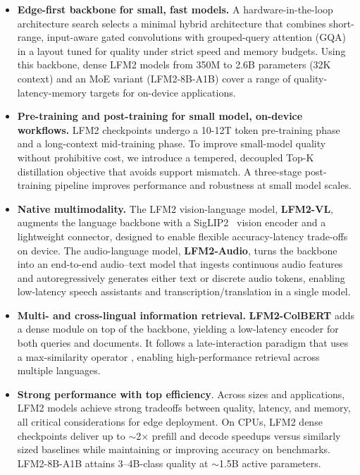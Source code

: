 \documentclass{article}
\begin{document}
\begin{itemize}
  \item \textbf{Edge-first backbone for small, fast models.} A hardware-in-the-loop architecture search selects a minimal hybrid architecture that combines short-range, input-aware gated convolutions with grouped-query attention (GQA) in a layout tuned for quality under strict speed and memory budgets.
  Using this backbone, dense LFM2 models from 350M to 2.6B parameters (32K context) and an MoE variant (LFM2-8B-A1B) cover a range of quality-latency-memory targets for on-device applications. 
  \item \textbf{Pre-training and post-training for small model, on-device workflows.} LFM2 checkpoints undergo a 10-12T token pre-training phase and a long-context mid-training phase. To improve small-model quality without prohibitive cost, we introduce a tempered, decoupled Top-K distillation objective that avoids support mismatch. A three-stage post-training pipeline improves performance and robustness at small model scales.

    
  \item \textbf{Native multimodality.} The LFM2 vision-language model, \textbf{LFM2-VL}, augments the language backbone with a SigLIP2~ \citep{tschannen2025siglip} vision encoder and a lightweight connector, designed to enable flexible accuracy-latency trade-offs on device. The audio-language model, \textbf{LFM2-Audio}, turns the backbone into an end-to-end audio–text model that ingests continuous audio features and autoregressively generates either text or discrete audio tokens, enabling low-latency speech assistants and transcription/translation in a single model. 
  \item \textbf{Multi- and cross-lingual information retrieval.} \textbf{LFM2-ColBERT} adds a dense module on top of the backbone, yielding a low-latency encoder for both queries and documents. It follows a late-interaction paradigm that uses a max-similarity operator \citep{khattab2020colbert}, enabling high-performance retrieval across multiple languages.
  \item \textbf{Strong performance with top efficiency}. Across sizes and applications, LFM2 models achieve strong tradeoffs between quality, latency, and memory, all critical considerations for edge deployment. On CPUs, LFM2 dense checkpoints deliver up to $\sim$2$\times$ prefill and decode speedups versus similarly sized baselines while maintaining or improving accuracy on benchmarks. LFM2-8B-A1B attains 3–4B-class quality at \(\sim\)1.5B active parameters.
  

\end{itemize}
\end{document}

